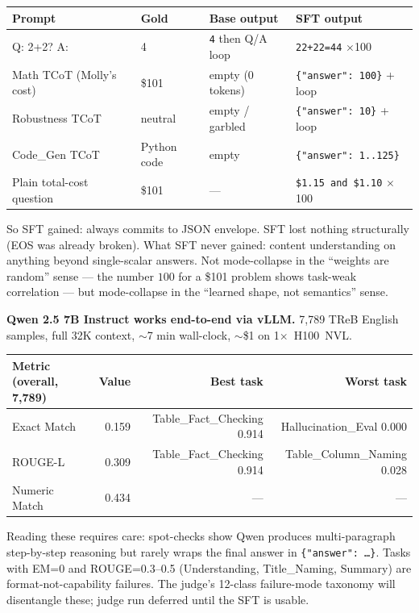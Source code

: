 \documentclass[11pt]{article}
\begin{document}
\begin{center}\small
\begin{tabular}{llll}
\toprule
\textbf{Prompt} & \textbf{Gold} & \textbf{Base output} & \textbf{SFT output} \\
\midrule
Q: 2+2? A:                & 4           & \texttt{4} then Q/A loop          & \texttt{22+22=44} $\times$100 \\
Math TCoT (Molly's cost)  & \$101       & empty (0 tokens)                  & \texttt{\{"answer": 100\}} + loop \\
Robustness TCoT           & neutral     & empty / garbled                   & \texttt{\{"answer": 10\}} + loop \\
Code\_Gen TCoT            & Python code & empty                             & \texttt{\{"answer": 1..125\}} \\
Plain total-cost question & \$101       & ---                               & \texttt{\$1.15 and \$1.10} $\times$100 \\
\bottomrule
\end{tabular}
\end{center}

So SFT gained: always commits to JSON envelope. SFT lost nothing structurally (EOS was already broken). What SFT never gained: content understanding on anything beyond single-scalar answers. Not mode-collapse in the ``weights are random'' sense --- the number $100$ for a \$101 problem shows task-weak correlation --- but mode-collapse in the ``learned shape, not semantics'' sense.

\textbf{Qwen 2.5 7B Instruct works end-to-end via vLLM.} 7{,}789 TReB English samples, full 32K context, $\sim$7 min wall-clock, $\sim$\$1 on 1$\times$~H100~NVL.

\begin{center}\small
\begin{tabular}{lrrr}
\toprule
\textbf{Metric (overall, 7{,}789)} & \textbf{Value} & \textbf{Best task} & \textbf{Worst task} \\
\midrule
Exact Match       & 0.159 & Table\_Fact\_Checking 0.914 & Hallucination\_Eval 0.000 \\
ROUGE-L           & 0.309 & Table\_Fact\_Checking 0.914 & Table\_Column\_Naming 0.028 \\
Numeric Match     & 0.434 & --- & --- \\
\bottomrule
\end{tabular}
\end{center}

Reading these requires care: spot-checks show Qwen produces multi-paragraph step-by-step reasoning but rarely wraps the final answer in \texttt{\{"answer": \ldots\}}. Tasks with EM=0 and ROUGE=0.3--0.5 (Understanding, Title\_Naming, Summary) are format-not-capability failures. The judge's 12-class failure-mode taxonomy will disentangle these; judge run deferred until the SFT is usable.
\end{document}
